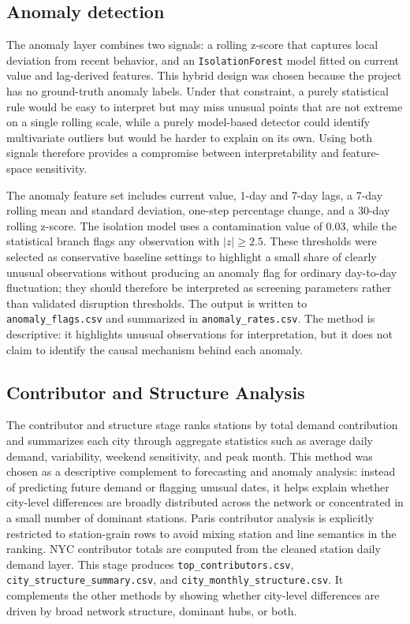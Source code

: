 \documentclass[10pt,twocolumn,a4paper]{article}
\begin{document}
\subsection{Anomaly detection}

The anomaly layer combines two signals: a rolling z-score that captures local
deviation from recent behavior, and an \texttt{IsolationForest} model fitted on
current value and lag-derived features. This hybrid design was chosen because
the project has no ground-truth anomaly labels. Under that constraint, a purely
statistical rule would be easy to interpret but may miss unusual points that
are not extreme on a single rolling scale, while a purely model-based detector
could identify multivariate outliers but would be harder to explain on its own.
Using both signals therefore provides a compromise between interpretability and
feature-space sensitivity.

The anomaly feature set includes current value, 1-day and 7-day lags, a 7-day
rolling mean and standard deviation, one-step percentage change, and a 30-day
rolling z-score. The isolation model uses a contamination value of 0.03, while
the statistical branch flags any observation with \(|z| \ge 2.5\). These
thresholds were selected as conservative baseline settings to highlight a small
share of clearly unusual observations without producing an anomaly flag for
ordinary day-to-day fluctuation; they should therefore be interpreted as
screening parameters rather than validated disruption thresholds. The output is
written to \nolinkurl{anomaly_flags.csv} and summarized in
\nolinkurl{anomaly_rates.csv}. The method is descriptive: it highlights unusual
observations for interpretation, but it does not claim to identify the causal
mechanism behind each anomaly.

\subsection{Contributor and Structure Analysis}

The contributor and structure stage ranks stations by total demand contribution
and summarizes each city through aggregate statistics such as average daily
demand, variability, weekend sensitivity, and peak month. This method was
chosen as a descriptive complement to forecasting and anomaly analysis: instead
of predicting future demand or flagging unusual dates, it helps explain whether
city-level differences are broadly distributed across the network or
concentrated in a small number of dominant stations. Paris contributor analysis
is explicitly restricted to station-grain rows to avoid mixing station and line
semantics in the ranking. NYC contributor totals are computed from the cleaned
station daily demand layer. This stage produces
\nolinkurl{top_contributors.csv},
\nolinkurl{city_structure_summary.csv}, and
\nolinkurl{city_monthly_structure.csv}. It complements the other methods by
showing whether city-level differences are driven by broad network structure,
dominant hubs, or both.
\end{document}
